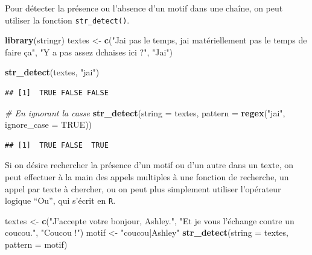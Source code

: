 \documentclass[
  11pt,
]{book}
\newenvironment{Shaded}{\begin{snugshade}}{\end{snugshade}}
\newcommand{\CommentTok}[1]{\textcolor[rgb]{0.56,0.35,0.01}{\textit{#1}}}
\newcommand{\DataTypeTok}[1]{\textcolor[rgb]{0.13,0.29,0.53}{#1}}
\newcommand{\KeywordTok}[1]{\textcolor[rgb]{0.13,0.29,0.53}{\textbf{#1}}}
\newcommand{\NormalTok}[1]{#1}
\newcommand{\OtherTok}[1]{\textcolor[rgb]{0.56,0.35,0.01}{#1}}
\newcommand{\StringTok}[1]{\textcolor[rgb]{0.31,0.60,0.02}{#1}}
\numberwithin{equation}{section}
\numberwithin{countremarque}{section}
\begin{document}
Pour détecter la présence ou l'absence d'un motif dans une chaîne, on peut utiliser la fonction \texttt{str\_detect()}.

\begin{Shaded}
\begin{Highlighting}[]
\KeywordTok{library}\NormalTok{(stringr)}
\NormalTok{textes \textless{}{-}}\StringTok{ }\KeywordTok{c}\NormalTok{(}\StringTok{"J\textquotesingle{}ai pas le temps, j\textquotesingle{}ai matériellement pas le temps de faire ça"}\NormalTok{,}
           \StringTok{"Y a pas assez d\textquotesingle{}chaises ici ?"}\NormalTok{,}
           \StringTok{"J\textquotesingle{}ai"}\NormalTok{)}

\KeywordTok{str\_detect}\NormalTok{(textes, }\StringTok{"j\textquotesingle{}ai"}\NormalTok{)}
\end{Highlighting}
\end{Shaded}

\begin{lstlisting}
## [1]  TRUE FALSE FALSE
\end{lstlisting}

\begin{Shaded}
\begin{Highlighting}[]
\CommentTok{\# En ignorant la casse}
\KeywordTok{str\_detect}\NormalTok{(}\DataTypeTok{string =}\NormalTok{ textes,}
           \DataTypeTok{pattern =} \KeywordTok{regex}\NormalTok{(}\StringTok{"j\textquotesingle{}ai"}\NormalTok{, }\DataTypeTok{ignore\_case =} \OtherTok{TRUE}\NormalTok{))}
\end{Highlighting}
\end{Shaded}

\begin{lstlisting}
## [1]  TRUE FALSE  TRUE
\end{lstlisting}

Si on désire rechercher la présence d'un motif ou d'un autre dans un texte, on peut effectuer à la main des appels multiples à une fonction de recherche, un appel par texte à chercher, ou on peut plus simplement utiliser l'opérateur logique ``Ou'', qui s'écrit \texttt{\textbar{}} en \texttt{R}.

\begin{Shaded}
\begin{Highlighting}[]
\NormalTok{textes  \textless{}{-}}\StringTok{ }\KeywordTok{c}\NormalTok{(}\StringTok{"J’accepte votre bonjour, Ashley."}\NormalTok{,}
            \StringTok{"Et je vous l’échange contre un coucou."}\NormalTok{, }
            \StringTok{"Coucou !"}\NormalTok{)}
\NormalTok{motif \textless{}{-}}\StringTok{ "coucou|Ashley"}
\KeywordTok{str\_detect}\NormalTok{(}\DataTypeTok{string =}\NormalTok{ textes, }\DataTypeTok{pattern =}\NormalTok{ motif)}
\end{Highlighting}
\end{Shaded}
\end{document}
